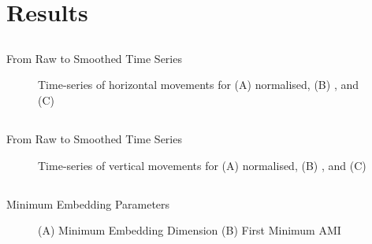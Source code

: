 \section{Results}

\subsection{}
{
\begin{frame}{From Raw to Smoothed Time Series}
   \begin{figure}
	\caption{Time-series of horizontal movements for 
	(A) normalised, (B) , and 
	(C)  } 
   \end{figure}
\end{frame}
}


\subsection{}
{
\begin{frame}{From Raw to Smoothed Time Series}
   \begin{figure}
	\caption{Time-series of vertical movements for 
	(A) normalised, (B) , and 
	(C)  } 
   \end{figure}
\end{frame}
}



\subsection{}
{
\begin{frame}{Minimum Embedding Parameters}
    \begin{figure}
	\caption{(A) Minimum Embedding Dimension 
		 (B) First Minimum AMI
		}  
   \end{figure}
	
\end{frame}
}


